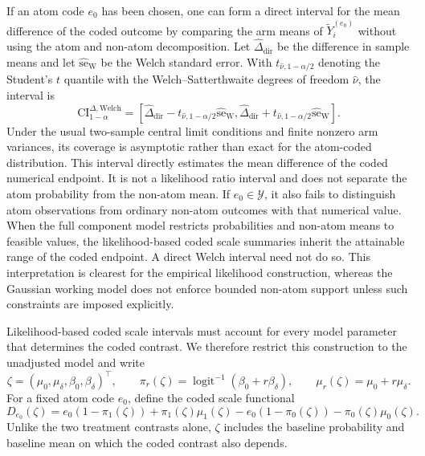 \documentclass[11pt]{article}
\DeclareMathOperator{\logit}{logit}
\begin{document}
If an atom code $e_0$ has been chosen, one can form a direct interval for the mean difference of the coded outcome by comparing the arm means of $\widetilde{Y}_i^{(e_0)}$ without using the atom and non-atom decomposition. Let $\widehat{\Delta}_{\mathrm{dir}}$ be the difference in sample means and let $\widehat{\mathrm{se}}_{\mathrm{W}}$ be the Welch standard error. With $t_{\widehat{\nu},1-\alpha/2}$ denoting the Student's $t$ quantile with the Welch--Satterthwaite degrees of freedom $\widehat{\nu}$, the interval is
\begin{equation}
  \mathrm{CI}^{\Delta,\mathrm{Welch}}_{1-\alpha}
  =
  \left[
    \widehat{\Delta}_{\mathrm{dir}}
    -
    t_{\widehat{\nu},1-\alpha/2}\widehat{\mathrm{se}}_{\mathrm{W}},
    \widehat{\Delta}_{\mathrm{dir}}
    +
    t_{\widehat{\nu},1-\alpha/2}\widehat{\mathrm{se}}_{\mathrm{W}}
  \right].
  \label{eq:welch-delta-ci}
\end{equation}
Under the usual two-sample central limit conditions and finite nonzero arm variances, its coverage is asymptotic rather than exact for the atom-coded distribution.
This interval directly estimates the mean difference of the coded numerical endpoint. It is not a likelihood ratio interval and does not separate the atom probability from the non-atom mean. If $e_0\in\mathcal{Y}$, it also fails to distinguish atom observations from ordinary non-atom outcomes with that numerical value.
When the full component model restricts probabilities and non-atom means to feasible values, the likelihood-based coded scale summaries inherit the attainable range of the coded endpoint. A direct Welch interval need not do so. This interpretation is clearest for the empirical likelihood construction, whereas the Gaussian working model does not enforce bounded non-atom support unless such constraints are imposed explicitly.

Likelihood-based coded scale intervals must account for every model parameter that determines the coded contrast. We therefore restrict this construction to the unadjusted model and write
\[
  \zeta=(\mu_0,\mu_\delta,\beta_0,\beta_\delta)^\top,
  \qquad
  \pi_r(\zeta)=\logit^{-1}(\beta_0+r\beta_\delta),
  \qquad
  \mu_r(\zeta)=\mu_0+r\mu_\delta.
\]
For a fixed atom code $e_0$, define the coded scale functional
\begin{equation*}
  D_{e_0}(\zeta)
  =
  e_0(1-\pi_1(\zeta))+\pi_1(\zeta)\mu_1(\zeta)
  -e_0(1-\pi_0(\zeta))-\pi_0(\zeta)\mu_0(\zeta).
\end{equation*}
Unlike the two treatment contrasts alone, $\zeta$ includes the baseline probability and baseline mean on which the coded contrast also depends.
\end{document}
